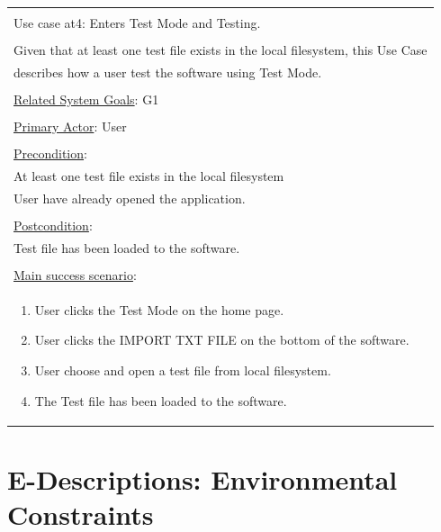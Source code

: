 \documentclass[fontsize=12pt,paper=letter,twoside]{scrartcl}
\begin{document}
\begin{table}[h]
	\begin{tabular}{|l|}
		\hline
		\\
		Use case at4: Enters Test Mode and Testing.							\\
		\\
		Given that at least one test file exists in the local filesystem, this Use Case		\\
		describes how a user test the software using Test Mode.					\\
		\\
		\underline{Related System Goals}: G1  											\\
		\\
		\underline{Primary Actor}: User														\\
		\\
		\underline{Precondition}:															\\ \qquad
		At least one test file exists in the local filesystem							\\ \qquad
		User have already opened the application.											\\
		\\
		\underline{Postcondition}:															\\ \qquad
		Test file has been loaded to the software.									\\
		\\
		\underline{Main success scenario}:													\\
		\begin{minipage}{6in}
			\vskip 4pt
			\begin{enumerate}
				\item User clicks the Test Mode on the home page. 
				\item User clicks the IMPORT TXT FILE on the bottom of the software. 
				\item User choose and open a test file from local filesystem.
				\item The Test file has been loaded to the software.	
			\end{enumerate}
			\vskip 4pt
		\end{minipage}
		\\
		\hline
	\end{tabular}
\end{table}

\newpage
\section{E-Descriptions: Environmental Constraints}
\end{document}
